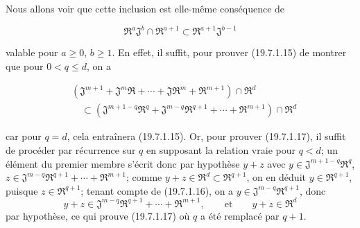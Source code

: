 Nous allons voir que cette inclusion est elle-même conséquence de
\begin{env}[19.7.1.16]
\label{IV.19.7.1.16}
\[
  \mathfrak R^a\mathfrak J^b\cap\mathfrak R^{a+1}\subset\mathfrak R^{a+1}\mathfrak J^{b-1}
\]
\end{env}
valable pour $a\geq0$, $b\geq1$. En effet, il suffit, pour prouver (19.7.1.15) de montrer que pour $0<q\leq d$, on a
\begin{env}[19.7.1.17]
\label{IV.19.7.1.17}
\[
\begin{aligned}
  &(\mathfrak J^{m+1}+\mathfrak J^m\mathfrak R+\cdots+\mathfrak J\mathfrak R^m+\mathfrak R^{m+1})\cap\mathfrak R^d\\
  &\quad\subset(\mathfrak J^{m+1-q}\mathfrak R^q+\mathfrak J^{m-q}\mathfrak R^{q+1}+\cdots+\mathfrak R^{m+1})\cap\mathfrak R^d
\end{aligned}
\]
\end{env}
car pour $q=d$, cela entraînera (19.7.1.15). Or, pour prouver (19.7.1.17), il suffit de procéder par récurrence sur $q$ en supposant la relation vraie pour $q<d$; un élément du premier membre s'écrit donc par hypothèse $y+z$ avec $y\in\mathfrak J^{m+1-q}\mathfrak R^q$, $z\in\mathfrak J^{m-q}\mathfrak R^{q+1}+\cdots+\mathfrak R^{m+1}$; comme $y+z\in\mathfrak R^d\subset\mathfrak R^{q+1}$, on en déduit $y\in\mathfrak R^{q+1}$, puisque $z\in\mathfrak R^{q+1}$; tenant compte de (19.7.1.16), on a $y\in\mathfrak J^{m-q}\mathfrak R^{q+1}$, donc
\[
  y+z\in\mathfrak J^{m-q}\mathfrak R^{q+1}+\cdots+\mathfrak R^{m+1},\qquad\text{et}\qquad y+z\in\mathfrak R^d
\]
par hypothèse, ce qui prouve (19.7.1.17) où $q$ a été remplacé par $q+1$.

